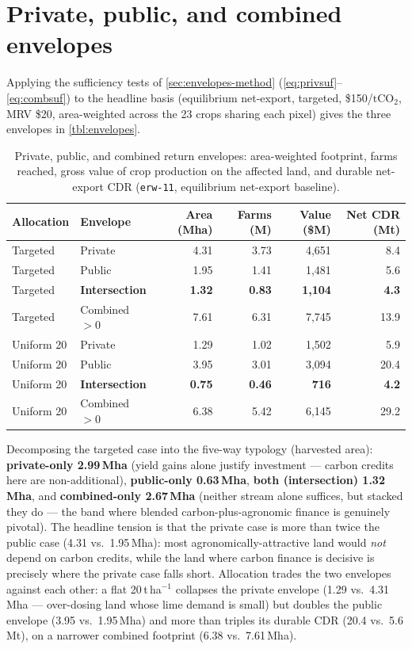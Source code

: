 \documentclass[openany]{book}
\newcommand{\tco}{\ensuremath{\mathrm{tCO_2}}}
\begin{document}
\section{Private, public, and combined envelopes}\label{sec:envelopes-results}

Applying the sufficiency tests of \autoref{sec:envelopes-method}
(\autoref{eq:privsuf}--\autoref{eq:combsuf}) to the headline basis (equilibrium
net-export, targeted, \$150/\tco, MRV \$20, area-weighted across the 23 crops
sharing each pixel) gives the three envelopes in \autoref{tbl:envelopes}.

{\footnotesize
\begin{longtable}[]{@{}llrrrr@{}}
\caption{Private, public, and combined return envelopes: area-weighted footprint,
farms reached, gross value of crop production on the affected land, and durable
net-export CDR (\texttt{erw-11}, equilibrium net-export baseline).}\label{tbl:envelopes}\\
\toprule
Allocation & Envelope & Area (Mha) & Farms (M) & Value (\$M) & Net CDR (Mt) \\
\midrule
\endhead
Targeted & Private & 4.31 & 3.73 & 4,651 & 8.4 \\
Targeted & Public & 1.95 & 1.41 & 1,481 & 5.6 \\
Targeted & \textbf{Intersection} & \textbf{1.32} & \textbf{0.83} & \textbf{1,104} & \textbf{4.3} \\
Targeted & Combined $>0$ & 7.61 & 6.31 & 7,745 & 13.9 \\
Uniform 20 & Private & 1.29 & 1.02 & 1,502 & 5.9 \\
Uniform 20 & Public & 3.95 & 3.01 & 3,094 & 20.4 \\
Uniform 20 & \textbf{Intersection} & \textbf{0.75} & \textbf{0.46} & \textbf{716} & \textbf{4.2} \\
Uniform 20 & Combined $>0$ & 6.38 & 5.42 & 6,145 & 29.2 \\
\bottomrule
\end{longtable}
}

Decomposing the targeted case into the five-way typology (harvested area):
\textbf{private-only 2.99\,Mha} (yield gains alone justify investment --- carbon
credits here are non-additional), \textbf{public-only 0.63\,Mha}, \textbf{both
(intersection) 1.32\,Mha}, and \textbf{combined-only 2.67\,Mha} (neither stream
alone suffices, but stacked they do --- the band where blended carbon-plus-agronomic
finance is genuinely pivotal). The headline tension is that the private case is
more than twice the public case (4.31 vs.\ 1.95\,Mha): most
agronomically-attractive land would \emph{not} depend on carbon credits, while
the land where carbon finance is decisive is precisely where the private case
falls short. Allocation trades the two envelopes against each other: a flat
20\,t\,ha$^{-1}$ collapses the private envelope (1.29 vs.\ 4.31\,Mha ---
over-dosing land whose lime demand is small) but doubles the public envelope
(3.95 vs.\ 1.95\,Mha) and more than triples its durable CDR (20.4 vs.\
5.6\,Mt), on a narrower combined footprint (6.38 vs.\ 7.61\,Mha).
\end{document}
